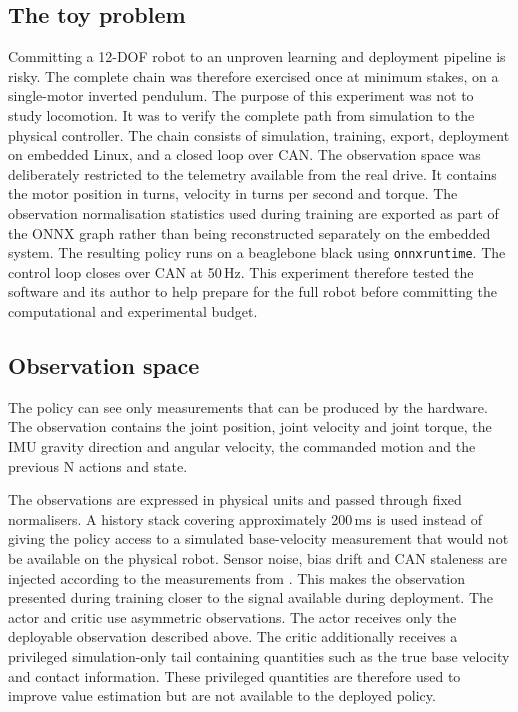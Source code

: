 \subsection{The toy problem}

\label{sec:toy-problem}

Committing a 12-DOF robot to an unproven learning and deployment pipeline is risky.
The complete chain was therefore exercised once at minimum stakes, on a single-motor inverted pendulum.
The purpose of this experiment was not to study locomotion. It was to verify the complete path from simulation to the physical controller.
The chain consists of simulation, training, export, deployment on embedded Linux, and a closed loop over CAN.
The observation space was deliberately restricted to the telemetry available from the real drive.
It contains the motor position in turns, velocity in turns per second and torque.
The observation normalisation statistics used during training are exported as part of the ONNX graph rather than being reconstructed separately on the embedded system.
The resulting policy runs on a beaglebone black using \texttt{onnxruntime}.
The control loop closes over CAN at 50\,Hz.
This experiment therefore tested the software and its author to help prepare for the full robot before committing the computational and experimental budget.

\subsection{Observation space}

The policy can see only measurements that can be produced by the hardware.
The observation contains the joint position, joint velocity and joint torque, the IMU gravity direction and angular velocity, the commanded motion and the previous N actions and state.

The observations are expressed in physical units and passed through fixed normalisers.
A history stack covering approximately 200\,ms is used instead of giving the policy access to a simulated base-velocity measurement that would not be available on the physical robot.
Sensor noise, bias drift and CAN staleness are injected according to the measurements from .
This makes the observation presented during training closer to the signal available during deployment.
The actor and critic use asymmetric observations.
The actor receives only the deployable observation described above.
The critic additionally receives a privileged simulation-only tail containing quantities such as the true base velocity and contact information.
These privileged quantities are therefore used to improve value estimation but are not available to the deployed policy.


